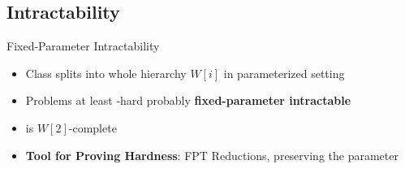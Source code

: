 \subsection{Intractability}
\begin{frame}[c]{Fixed-Parameter Intractability}
    \begin{itemize}
       \pause \item  Class \NP splits into whole hierarchy $W[i]$ in parameterized setting
       \pause \item Problems at least \WONEhs-hard probably \textbf{fixed-parameter intractable}
       \pause \item \dom is $W[2]$-complete
       \pause \item \textbf{Tool for Proving Hardness}: FPT Reductions, preserving the parameter
    \end{itemize}
\end{frame}


